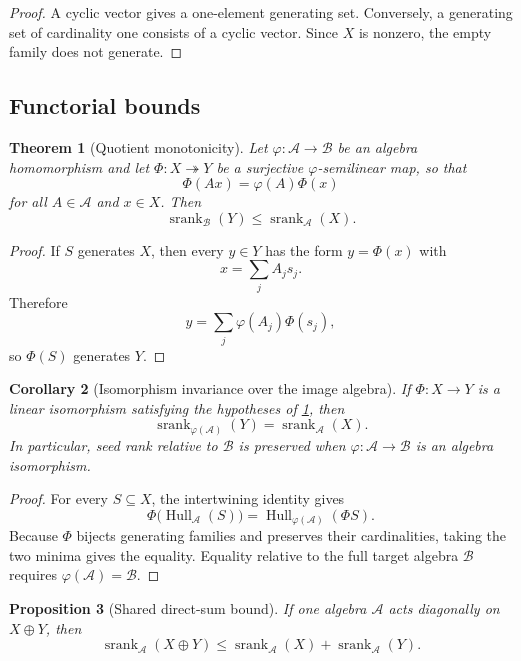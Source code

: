 \documentclass[11pt]{article}
\newtheorem{theorem}{Theorem}[section]
\newtheorem{proposition}[theorem]{Proposition}
\newtheorem{corollary}[theorem]{Corollary}
\theoremstyle{definition}
\theoremstyle{remark}
\newcommand{\cA}{\mathcal A}
\newcommand{\cB}{\mathcal B}
\newcommand{\Hull}{\operatorname{Hull}}
\newcommand{\srank}{\operatorname{srank}}
\begin{document}
\begin{proof}
A cyclic vector gives a one-element generating set. Conversely, a generating set of cardinality one consists of a cyclic vector. Since $X$ is nonzero, the empty family does not generate.
\end{proof}

\subsection{Functorial bounds}

\begin{theorem}[Quotient monotonicity]
\label{thm:quotient}
Let $\varphi:\cA\to\cB$ be an algebra homomorphism and let $\Phi:X\twoheadrightarrow Y$ be a surjective $\varphi$-semilinear map, so that
\[
\Phi(Ax)=\varphi(A)\Phi(x)
\]
for all $A\in\cA$ and $x\in X$. Then
\[
{
\srank_{\cB}(Y)\le \srank_{\cA}(X).
}
\]
\end{theorem}

\begin{proof}
If $S$ generates $X$, then every $y\in Y$ has the form $y=\Phi(x)$ with
\[
x=\sum_j A_js_j.
\]
Therefore
\[
y=\sum_j\varphi(A_j)\Phi(s_j),
\]
so $\Phi(S)$ generates $Y$.
\end{proof}

\begin{corollary}[Isomorphism invariance over the image algebra]
\label{cor:image-algebra-invariance}
If $\Phi:X\to Y$ is a linear isomorphism satisfying the hypotheses of \cref{thm:quotient}, then
\[
\srank_{\varphi(\cA)}(Y)=\srank_{\cA}(X).
\]
In particular, seed rank relative to $\cB$ is preserved when $\varphi:\cA\to\cB$ is an algebra isomorphism.
\end{corollary}

\begin{proof}
For every $S\subseteq X$, the intertwining identity gives
\[
\Phi\bigl(\Hull_{\cA}(S)\bigr)
=
\Hull_{\varphi(\cA)}(\Phi S).
\]
Because $\Phi$ bijects generating families and preserves their cardinalities, taking the two minima gives the equality. Equality relative to the full target algebra $\cB$ requires $\varphi(\cA)=\cB$.
\end{proof}

\begin{proposition}[Shared direct-sum bound]
\label{prop:shared-direct-sum}
If one algebra $\cA$ acts diagonally on $X\oplus Y$, then
\[
{
\srank_{\cA}(X\oplus Y)
\le
\srank_{\cA}(X)+\srank_{\cA}(Y).
}
\]
\end{proposition}
\end{document}
